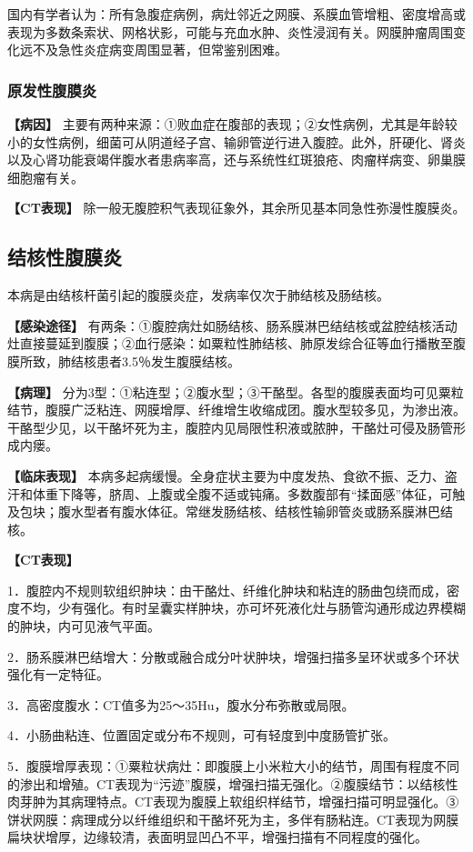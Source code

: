 国内有学者认为：所有急腹症病例，病灶邻近之网膜、系膜血管增粗、密度增高或表现为多数条索状、网格状影，可能与充血水肿、炎性浸润有关。网膜肿瘤周围变化远不及急性炎症病变周围显著，但常鉴别困难。

\subsubsection{原发性腹膜炎}

\textbf{【病因】}
主要有两种来源：①败血症在腹部的表现；②女性病例，尤其是年龄较小的女性病例，细菌可从阴道经子宫、输卵管逆行进入腹腔。此外，肝硬化、肾炎以及心肾功能衰竭伴腹水者患病率高，还与系统性红斑狼疮、肉瘤样病变、卵巢膜细胞瘤有关。

\textbf{【CT表现】}
除一般无腹腔积气表现征象外，其余所见基本同急性弥漫性腹膜炎。

\subsection{结核性腹膜炎}

本病是由结核杆菌引起的腹膜炎症，发病率仅次于肺结核及肠结核。

\textbf{【感染途径】}
有两条：①腹腔病灶如肠结核、肠系膜淋巴结结核或盆腔结核活动灶直接蔓延到腹膜；②血行感染：如粟粒性肺结核、肺原发综合征等血行播散至腹膜所致，肺结核患者3.5％发生腹膜结核。

\textbf{【病理】}
分为3型：①粘连型；②腹水型；③干酪型。各型的腹膜表面均可见粟粒结节，腹膜广泛粘连、网膜增厚、纤维增生收缩成团。腹水型较多见，为渗出液。干酪型少见，以干酪坏死为主，腹腔内见局限性积液或脓肿，干酪灶可侵及肠管形成内瘘。

\textbf{【临床表现】}
本病多起病缓慢。全身症状主要为中度发热、食欲不振、乏力、盗汗和体重下降等，脐周、上腹或全腹不适或钝痛。多数腹部有“揉面感”体征，可触及包块；腹水型者有腹水体征。常继发肠结核、结核性输卵管炎或肠系膜淋巴结核。

\textbf{【CT表现】}

1．腹腔内不规则软组织肿块：由干酪灶、纤维化肿块和粘连的肠曲包绕而成，密度不均，少有强化。有时呈囊实样肿块，亦可坏死液化灶与肠管沟通形成边界模糊的肿块，内可见液气平面。

2．肠系膜淋巴结增大：分散或融合成分叶状肿块，增强扫描多呈环状或多个环状强化有一定特征。

3．高密度腹水：CT值多为25～35Hu，腹水分布弥散或局限。

4．小肠曲粘连、位置固定或分布不规则，可有轻度到中度肠管扩张。

5．腹膜增厚表现：①粟粒状病灶：即腹膜上小米粒大小的结节，周围有程度不同的渗出和增殖。CT表现为“污迹”腹膜，增强扫描无强化。②腹膜结节：以结核性肉芽肿为其病理特点。CT表现为腹膜上软组织样结节，增强扫描可明显强化。③饼状网膜：病理成分以纤维组织和干酪坏死为主，多伴有肠粘连。CT表现为网膜扁块状增厚，边缘较清，表面明显凹凸不平，增强扫描有不同程度的强化。

